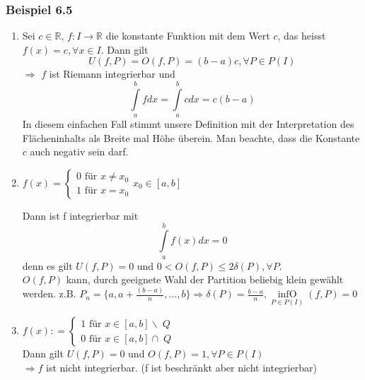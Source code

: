 \subsubsection*{Beispiel 6.5}
\begin{enumerate}[\indent 1)]
\item Sei $c\in \mathbb{R}$, $f:I\rightarrow \mathbb{R}$ die konstante Funktion mit dem Wert $c$, das heisst $f(x)=c, \forall x\in I$. Dann gilt $$U(f,P)=O(f,P)=(b-a)c, \forall P\in P(I)$$ $\Rightarrow$ $f$ ist Riemann integrierbar und $$\int\limits_a^b {fdx}  = \int\limits_a^b {cdx = c(b - a)} $$ In diesem einfachen Fall stimmt unsere Definition mit der Interpretation des Flächeninhalts als Breite mal Höhe überein. Man beachte, dass die Konstante $c$ auch negativ sein darf. 
\item $f(x) = \left\{ {\begin{array}{*{20}{c}}
{0{\text{ für }}x \ne {x_0}}\\
{1{\text{ für }}x = {x_0}}
\end{array}} \right.{x_0} \in [a,b]$

\begin{center}
\end{center}



Dann ist f integrierbar mit $$\int\limits_a^b {f(x)dx = 0}$$ denn es gilt $U(f,P)=0$ und $0<O(f,P) \leq 2\delta(P), \forall P$.\\

$O(f,P)$ kann, durch geeignete Wahl der Partition beliebig klein gewählt werden. z.B. $P_n=\{a,a+\frac{{(b - a)}}{n},\dots,b\} \Rightarrow \delta (P)=\frac{b-a}{n}, \mathop {\inf O}\limits_{P \in P(I)}(f,P) = 0$

\item $f(x): = \left\{ {\begin{array}{*{20}{c}}
{1{\text{ für }}x \in [a,b]\backslash \;Q}\\
{0{\text{ für }}x \in [a,b] \cap \;Q}
\end{array}} \right.$
\\

Dann gilt $U(f,P)=0$ und $O(f,P)=1, \forall P\in P(I)$\\
$\Rightarrow f$ ist nicht integrierbar. (f ist beschränkt aber nicht integrierbar)
\end{enumerate}

